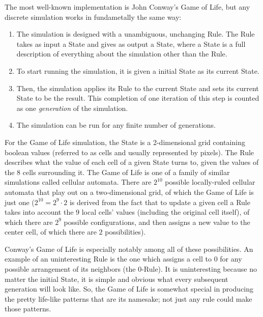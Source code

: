 \documentclass{article}
\newcommand{\ti}[1]{\textit{#1}}
\begin{document}

The most well-known implementation is John Conway's Game of Life, but any discrete simulation works in fundametally the same way:

\begin{enumerate}
\item The simulation is designed with a unambiguous, unchanging Rule. The Rule takes as input a State and gives as output a State, where a State is a full description of everything about the simulation other than the Rule.
\item To start running the simulation, it is given a initial State as its current State.
\item Then, the simulation applies its Rule to the current State and sets its current State to be the result. This completion of one iteration of this step is counted as one \ti{generation} of the simulation.
\item The simulation can be run for any finite number of generations.
\end{enumerate}

For the Game of Life simulation, the State is a 2-dimensional grid containing boolean values (referred to as cells and usually represented by pixels). The Rule describes what the value of each cell of a given State turns to, given the values of the 8 cells surrounding it. The Game of Life is one of a family of similar simulations called cellular automata. There are $2^{10}$ possible locally-ruled cellular automata that play out on a two-dimensional grid, of which the Game of Life is just one ($2^{10} = 2^9 \cdot 2$ is derived from the fact that to update a given cell a Rule takes into account the $9$ local cells' values (including the original cell itself), of which there are $2^9$ possible configurations, and then assigns a new value to the center cell, of which there are $2$ possibilities).

Conway's Game of Life is especially notably among all of these possibilities. An example of an uninteresting Rule is the one which assigns a cell to $0$ for any possible arrangement of its neighbors (the 0-Rule). It is uninteresting because no matter the initial State, it is simple and obvious what every subsequent generation will look like. So, the Game of Life is somewhat special in producing the pretty life-like patterns that are its namesake; not just any rule could make those patterns.
\end{document}

